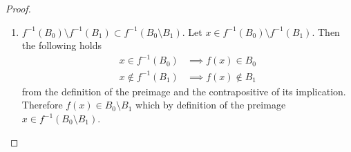 \begin{proof}
\begin{enumerate}
\begin{enumerate}
        \item $f^{-1} (B_0) \setminus f^{-1} (B_1) \subset f^{-1} (B_0 \setminus B_1)$. Let $x \in f^{-1} (B_0) \setminus f^{-1} (B_1)$. Then the following holds 
          \begin{align}
            x \in f^{-1} (B_0) & \implies f(x) \in B_0 \\
            x \not\in f^{-1} (B_1) & \implies f(x) \not\in B_1
          \end{align} 
          from the definition of the preimage and the contrapositive of its implication. Therefore $f(x) \in B_0 \setminus B_1$ which by definition of the preimage $x \in f^{-1} (B_0 \setminus B_1)$. 
      \end{enumerate}
    \end{enumerate}
  \end{proof}

